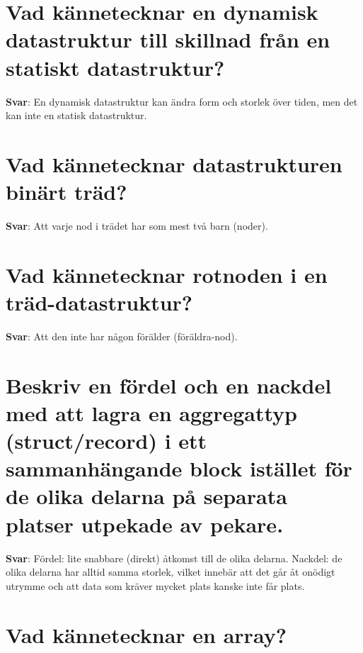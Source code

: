 \documentclass[a4paper,11pt,oneside]{book}
\begin{document}
\begin{sloppypar}
\section{Vad k\"annetecknar en dynamisk datastruktur till skillnad fr\r{a}n en statiskt datastruktur?}

\label{q:269:sa:sv:True}

\textbf{Svar}: En dynamisk datastruktur kan \"andra form och storlek \"over tiden, men det kan inte en statisk datastruktur.



\section{Vad k\"annetecknar datastrukturen bin\"art tr\"ad?}

\label{q:270:sa:sv:True}

\textbf{Svar}: Att varje nod i tr\"adet har som mest tv\r{a} barn (noder).



\section{Vad k\"annetecknar rotnoden i en tr\"ad-datastruktur?}

\label{q:271:sa:sv:True}

\textbf{Svar}: Att den inte har n\r{a}gon f\"or\"alder (f\"or\"aldra-nod).



\section{Beskriv en f\"ordel och en nackdel med att lagra en aggregattyp (struct/record) i ett sammanh\"angande block ist\"allet f\"or de olika delarna p\r{a} separata platser utpekade av pekare.}

\label{q:272:sa:sv:True}

\textbf{Svar}: F\"ordel: lite snabbare (direkt) \r{a}tkomst till de olika delarna. Nackdel: de olika delarna har alltid samma storlek, vilket inneb\"ar att det g\r{a}r \r{a}t on\"odigt utrymme och att data som kr\"aver mycket plats kanske inte f\r{a}r plats.



\section{Vad k\"annetecknar en array?}

\label{q:273:sa:sv:True}


\end{sloppypar}
\end{document}
